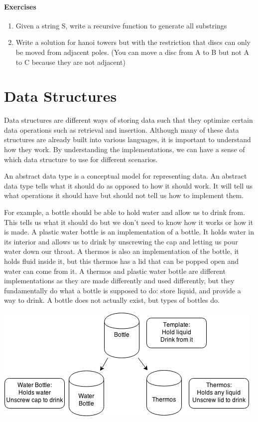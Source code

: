\documentclass[11pt,oneside]{book}
\makeatletter
\def\maxwidth#1{\ifdim\Gin@nat@width>#1 #1\else\Gin@nat@width\fi}
\makeatother
\begin{document}
\subsection{Exercises}

\begin{enumerate}
\item Given a string S, write a recursive function to generate all substrings
\item Write a solution for hanoi towers but with the restriction that discs can only be moved from adjacent poles. (You can move a disc from A to B but not A to C because they are not adjacent)
\end{enumerate}

\part{ Data Structures }
    

Data structures are different ways of storing data such that they optimize certain data operations such as retrieval and insertion. Although many of these data structures are already built into various languages, it is important to understand how they work. By understanding the implementations, we can have a sense of which data structure to use for different scenarios.

An abstract data type is a conceptual model for representing data. An abstract data type tells what it should do as opposed to how it should work. It will tell us what operations it should have but should not tell us how to implement them.

For example, a bottle should be able to hold water and allow us to drink from. This tells us what it should do but we don't need to know how it works or how it is made. A plastic water bottle is an implementation of a bottle. It holds water in its interior and allows us to drink by unscrewing the cap and letting us pour water down our throat. A thermos is also an implementation of the bottle, it holds fluid inside it, but this thermos has a lid that can be popped open and water can come from it. A thermos and plastic water bottle are different implementations as they are made differently and used differently, but they fundamentally do what a bottle is supposed to do: store liquid, and provide a way to drink. A bottle does not actually exist, but types of bottles do.

\vspace{5px}\includegraphics[width=\maxwidth{\textwidth}]{bottle.png}
\end{document}
